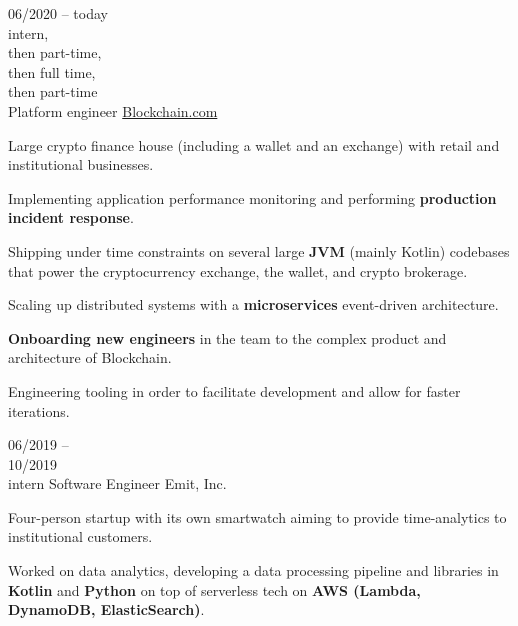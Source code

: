 \begin{entrylist}
    \entry
    {
        06/2020 -- today\\\footnotesize{intern,\\then part-time, \\then full time, \\then part-time}\\
    }
    {Platform engineer}
    {\href{https://blockchain.com/about}{Blockchain.com}}
    {
        Large crypto finance house (including a wallet and an exchange) with retail and
    institutional businesses.

    \para
    Implementing application performance monitoring and performing \textbf{production incident response}.

    \para
    Shipping under time constraints on several large \textbf{JVM} (mainly Kotlin) codebases that power the
    cryptocurrency exchange, the wallet, and crypto brokerage.

    \para
    Scaling up distributed systems with a \textbf{microservices} event-driven architecture.

    \para
    \textbf{Onboarding new engineers} in the team to the complex product and architecture of Blockchain.

    \para
    Engineering tooling in order to facilitate development and allow for faster iterations.
    }
    \entry
    {06/2019 -- \\ 10/2019\\\footnotesize{intern}}
    {Software Engineer}
    {Emit, Inc.}
    {
        Four-person startup with its own smartwatch aiming to provide time-analytics to
        institutional customers.

        \para
        Worked on data analytics, developing a data processing pipeline and libraries in
    \textbf{Kotlin} and \textbf{Python} on top of serverless tech on \textbf{AWS (Lambda,
        DynamoDB, ElasticSearch)}.
    }
\end{entrylist}

